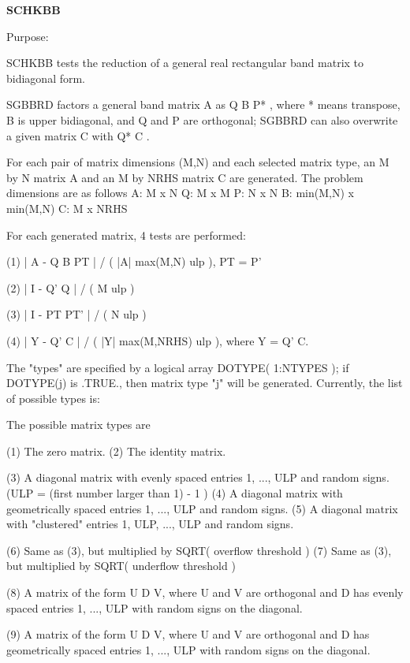 {\bfseries S\+C\+H\+K\+B\+B} 

\begin{DoxyParagraph}{Purpose\+: }
\begin{DoxyVerb} SCHKBB tests the reduction of a general real rectangular band
 matrix to bidiagonal form.

 SGBBRD factors a general band matrix A as  Q B P* , where * means
 transpose, B is upper bidiagonal, and Q and P are orthogonal;
 SGBBRD can also overwrite a given matrix C with Q* C .

 For each pair of matrix dimensions (M,N) and each selected matrix
 type, an M by N matrix A and an M by NRHS matrix C are generated.
 The problem dimensions are as follows
    A:          M x N
    Q:          M x M
    P:          N x N
    B:          min(M,N) x min(M,N)
    C:          M x NRHS

 For each generated matrix, 4 tests are performed:

 (1)   | A - Q B PT | / ( |A| max(M,N) ulp ), PT = P'

 (2)   | I - Q' Q | / ( M ulp )

 (3)   | I - PT PT' | / ( N ulp )

 (4)   | Y - Q' C | / ( |Y| max(M,NRHS) ulp ), where Y = Q' C.

 The "types" are specified by a logical array DOTYPE( 1:NTYPES );
 if DOTYPE(j) is .TRUE., then matrix type "j" will be generated.
 Currently, the list of possible types is:

 The possible matrix types are

 (1)  The zero matrix.
 (2)  The identity matrix.

 (3)  A diagonal matrix with evenly spaced entries
      1, ..., ULP  and random signs.
      (ULP = (first number larger than 1) - 1 )
 (4)  A diagonal matrix with geometrically spaced entries
      1, ..., ULP  and random signs.
 (5)  A diagonal matrix with "clustered" entries 1, ULP, ..., ULP
      and random signs.

 (6)  Same as (3), but multiplied by SQRT( overflow threshold )
 (7)  Same as (3), but multiplied by SQRT( underflow threshold )

 (8)  A matrix of the form  U D V, where U and V are orthogonal and
      D has evenly spaced entries 1, ..., ULP with random signs
      on the diagonal.

 (9)  A matrix of the form  U D V, where U and V are orthogonal and
      D has geometrically spaced entries 1, ..., ULP with random
      signs on the diagonal.


\end{DoxyVerb}
\end{DoxyParagraph}
